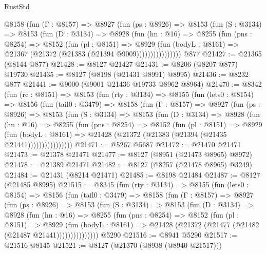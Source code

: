 \begin{lexlean}{RustStd}
\begin{coremodule}
            @8158
              (fun (Γ : @8157) =>
              @8927
                (fun (ps : @8926) =>
                @8153
                  (fun (S : @3134) =>
                  @8153
                    (fun (D : @3134) =>
                    @8928
                      (fun (hn : @16) =>
                      @8255
                        (fun (pns : @8254) =>
                        @8152
                          (fun (pl : @8151) =>
                          @8929
                            (fun (bodyL : @8161) =>
                            @21367 (@21372 (@21383 (@21394 @9009))))))))))))))))
    @877
@21427 := @21365 (@8144 @877)
@21428 := @8127 @21427
@21431 := @8206 (@8207 @877) @19730
@21435 := @8127 (@8198 (@21431 @8991) @8995)
@21436 := @8232 @877
@21441 := @9000 (@9001 @21436 @19733 @8962 @8964)
@21470 := @8342
    (fun (rc : @8151) =>
    @8153
      (fun (rty : @3134) =>
      @8155
        (fun (lets0 : @8154) =>
        @8156
          (fun (tail0 : @3479) =>
          @8158
            (fun (Γ : @8157) =>
            @8927
              (fun (ps : @8926) =>
              @8153
                (fun (S : @3134) =>
                @8153
                  (fun (D : @3134) =>
                  @8928
                    (fun (hn : @16) =>
                    @8255
                      (fun (pns : @8254) =>
                      @8152
                        (fun (pl : @8151) =>
                        @8929
                          (fun (bodyL : @8161) =>
                          @21428 (@21372 (@21383 (@21394 (@21435 @21441))))))))))))))))
@21471 := @5267 @5687
@21472 := @21470 @21471
@21473 := @21378 @21471
@21477 := @8127 (@8951 (@21473 @8965) @8972)
@21478 := @21389 @21471
@21482 := @8127 (@8257 (@21478 @8965) @3249)
@21484 := @21431 (@8214 @21471)
@21485 := @8198 @21484
@21487 := @8127 (@21485 @8995)
@21515 := @8345
    (fun (rty : @3134) =>
    @8155
      (fun (lets0 : @8154) =>
      @8156
        (fun (tail0 : @3479) =>
        @8158
          (fun (Γ : @8157) =>
          @8927
            (fun (ps : @8926) =>
            @8153
              (fun (S : @3134) =>
              @8153
                (fun (D : @3134) =>
                @8928
                  (fun (hn : @16) =>
                  @8255
                    (fun (pns : @8254) =>
                    @8152
                      (fun (pl : @8151) =>
                      @8929
                        (fun (bodyL : @8161) =>
                        @21428 (@21372 (@21477 (@21482 (@21487 @21441)))))))))))))))
    @5290
@21516 := @8941 @5290
@21517 := @21516 @8145
@21521 := @8127 (@21370 (@8938 (@8940 @21517)))

\end{coremodule}
\end{lexlean}
